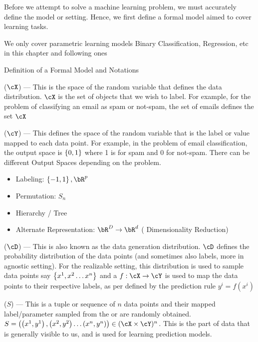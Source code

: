\documentclass{article}
\begin{document}
\makeheader%

Before we attempt to solve a machine learning problem, we must accurately define the model or setting. Hence, we first define a formal model aimed to cover learning tasks. \br

We only cover parametric learning models  Binary Classification, Regression, etc in this chapter and following ones

\begin{ssection}{Definition of a Formal Model and Notations}

	\begin{enumerate}[label=\bt{\theenumi.}]
		 ($\cX$) --- This is the space of the random variable that defines the data distribution. $\cX$ is the set of objects that we wish to label. For example, for the problem of classifying an email as spam or not-spam, the set of emails defines the set $\cX$ \sbr

		 ($\cY$) --- This defines the space of the random variable that is the label or value mapped to each data point. For example, in the problem of email classification, the output space is $\left\{ {0, 1} \right\}$ where 1 is for spam and 0 for not-spam. There can be different Output Spaces depending on the problem.

			\begin{itemize}[label=-\;]
				\item Labeling: $\set{-1, 1}, \bR^p$
				\item Permutation: $S_n$
				\item Hierarchy / Tree
				\item Alternate Representation: $\bR^D \ra \bR^d$ ( Dimensionality Reduction)
			\end{itemize} \sbr

		\ditem[Distribution] ($\cD$) --- This is also known as the data generation distribution. $\cD$ defines the probability distribution of the data points (and sometimes also labels, more in agnostic setting). For the realizable setting, this distribution is used to sample data points say $\left\{ {x^1, x^2 \dots x^n} \right\}$ and a  $f : \cX \ra \cY$ is used to map the data points to their respective labels, as per defined by the prediction rule  $y^i = f(x^i)$

		 ($S$) --- This is a tuple or sequence of $n$ data points and their mapped label/parameter sampled from the  or are randomly obtained. $S = \para{\para{x^1, y^1}, \para{x^2, y^2} \dots \para{x^n, y^n}} \in (\cX \times \cY)^n$. This is the part of data that is generally visible to us, and is used for learning prediction models.


\end{enumerate}
\end{ssection}
\end{document}

